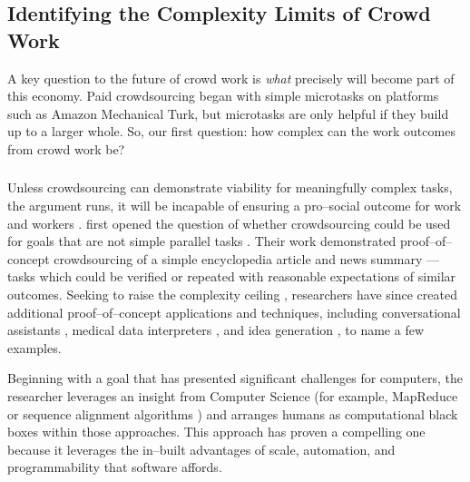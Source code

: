 \documentclass[trackingWork]{subfiles}
\begin{document}
\begin{comment}
Crowdwork
  - Kittur said let's do complex stuff
  - This works by using CS techniques
  - Clear that this works in focused cases
  - More recent shift toward using experts
\end{comment}

\subsection[What are the complexity limits of crowd work]
{Identifying the Complexity Limits of Crowd Work}\label{sec:complexity}
A key question to the future of crowd work is
\textit{what} precisely will become part of this economy.
Paid crowdsourcing began with simple microtasks on platforms such as
Amazon Mechanical Turk, but
microtasks are only helpful if they build up to a larger whole.
So, our first question:
how complex can the work outcomes from crowd work be?

\subsubsection{\crowdworkpers}

Unless crowdsourcing can demonstrate viability for meaningfully complex tasks,
the argument runs,
it will be incapable of ensuring a pro--social outcome for work and workers
\cite{crowdworkFuture}.
\citeauthor{crowdForgeKittur} first opened the question of
whether crowdsourcing could be used for goals that are not simple parallel tasks
\cite{crowdForgeKittur}.
Their work demonstrated proof--of--concept crowdsourcing of
a simple encyclopedia article and news summary
--- tasks which could be verified or repeated
with reasonable expectations of similar outcomes.
Seeking to raise the complexity ceiling
\cite{myers2000past},
researchers have since created
additional proof--of--concept applications and techniques,
including conversational assistants \cite{Lasecki:2013:CCC:2501988.2502057},
medical data interpreters \cite{Lasecki:2013:CCC:2501988.2502057}, and
idea generation \cite{YuEncouragingOutside,yu2014distributed,Yu2016a},
to name a few examples.

Beginning with a goal that has
presented significant challenges for computers,
the researcher leverages an insight from Computer Science
(for example, MapReduce
\cite{crowdForgeKittur} or
sequence alignment algorithms
\cite{lasecki2012real})
and arranges humans as computational black boxes within those approaches.
This approach has proven a compelling one because
it leverages the in--built advantages of
scale,
automation, and
programmability that software affords.
\end{document}
